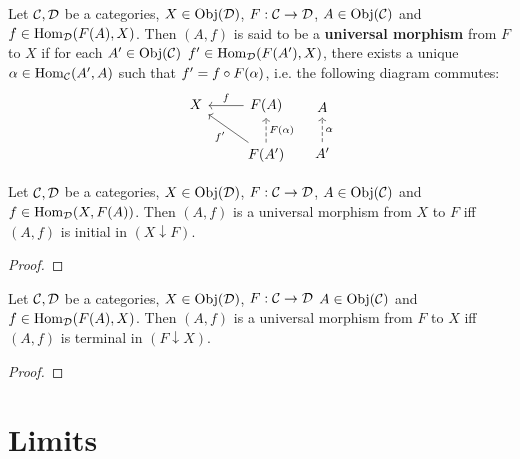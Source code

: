 \documentclass{book}
\begin{document}
	\begin{defn}
		Let $\mathcal{C}, \mathcal{D}$ be a categories, $X \in \operatorname{Obj}(\mathcal{D})$, $F: \mathcal{C} \rightarrow \mathcal{D}$, $A \in \operatorname{Obj}(\mathcal{C})$ and $f \in \operatorname{Hom}_{\mathcal{D}}(F(A), X)$. Then $(A, f)$ is said to be a \textbf{universal morphism} from $F$ to $X$ if for each $A' \in \operatorname{Obj}(\mathcal{C})$ $f' \in \operatorname{Hom}_{\mathcal{D}}(F(A'), X)$, there exists a unique $\alpha \in \operatorname{Hom}_{\mathcal{C}}(A', A)$ such that $f' = f \circ F(\alpha)$, i.e. the following diagram commutes:
		\[
		\begin{tikzcd}
			X   & F(A) \arrow[l, "f"'] \\
			& F(A')  \arrow[ul, "f'"] \arrow[u, "F(\al)"', dashed]  
		\end{tikzcd}
		\hspace{.3cm}
		\begin{tikzcd}
			A \\
			A'  \arrow[u, "\al"', dashed]   
		\end{tikzcd}
		\]
	\end{defn}

	\begin{ex}
		Let $\mathcal{C}, \mathcal{D}$ be a categories, $X \in \operatorname{Obj}(\mathcal{D})$, $F: \mathcal{C} \rightarrow \mathcal{D}$, $A \in \operatorname{Obj}(\mathcal{C})$ and $f \in \operatorname{Hom}_{\mathcal{D}}(X, F(A))$. Then $(A, f)$ is a universal morphism from $X$ to $F$ iff $(A, f)$ is initial in $(X \downarrow F)$.  
	\end{ex}

	\begin{proof}
		
	\end{proof}

	\begin{ex}
		Let $\mathcal{C}, \mathcal{D}$ be a categories, $X \in \operatorname{Obj}(\mathcal{D})$, $F: \mathcal{C} \rightarrow \mathcal{D}$ $A \in \operatorname{Obj}(\mathcal{C})$ and $f \in \operatorname{Hom}_{\mathcal{D}}(F(A), X)$. Then $(A, f)$ is a universal morphism from $F$ to $X$ iff $(A, f)$ is terminal in $(F \downarrow X)$.  
	\end{ex}

	\begin{proof}
		
	\end{proof}


















	
	
	\newpage
	\section{Limits}
	
\end{document}

